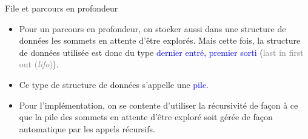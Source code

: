 \documentclass[10pt,french]{beamer}
\begin{document}
\begin{frame}[fragile]{\Ctitle}{\stitle}
	\begin{block}{File et parcours en profondeur}
		\begin{itemize}
			\item<1-> Pour un parcours en profondeur, on stocker aussi dans une structure de données les sommets en attente d'être explorés. Mais cette fois, la structure de données utilisée est donc du type \textcolor{blue}{dernier entré, premier sorti} (\textcolor{gray}{last in first out (\textit{\sc lifo})}).
			\item<2-> Ce type de structure de données s'appelle une \textcolor{blue}{pile}.
			\item<3-> Pour l'implémentation, on se contente d'utiliser la récursivité de façon à ce que la pile des sommets en attente d'être exploré soit gérée de façon automatique par les appels récursifs.
		\end{itemize}
	\end{block}
\end{frame}
\end{document}
